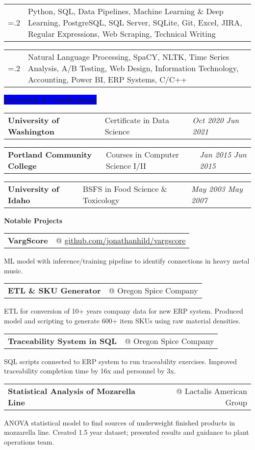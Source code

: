 \documentclass[letterpaper,12pt]{article}[leftmargin=*]
\makeatletter
\newcommand{\projects}[2]{\vspace{4pt}
  \colorbox{Copper}{\color{white}#1\hspace{9pt}\raggedbottom\normalsize\textbf{#2\hspace{4pt}}}
}
\newcommand{\education}[2]{\vspace{4pt}
  \colorbox{Blue}{\color{white}#1\hspace{9pt}\raggedbottom\normalsize\textbf{#2\hspace{4pt}}}
}
\newcommand{\resumeSectionStart}{\begin{itemize}[leftmargin=0.1in]}
\newcommand{\resumeSectionEnd}{\end{itemize}}
\newcommand{\repo}[2]{\href{#1}{\underline{#2}}}
\newcommand{\resumeProject}[3]{
  \vspace{-6pt}\item[]
    \begin{tabularx}{0.97\textwidth}{X@{\hspace{60pt}} r}
      \textbf{\color{primary}#1} & {\color{accent}\small#2} \\
    \end{tabularx}
    {#3}
}
\newcommand{\resumeSkill}[2]{
  \vspace{-6pt}
  \item[]
    \begin{tabularx}{0.97\textwidth}{>{\hsize=.2\hsize}X X }
      {\textbf{#1}} & {\small#2} \\
    \end{tabularx}
}
\newcommand{\resumeEducation}[3]{
  \vspace{-6pt}
  \item[]
    \begin{tabularx}{0.97\textwidth}[t]{>{\raggedright}X >{\raggedright\arraybackslash}X >{\raggedleft\arraybackslash}X}
      \textbf{\color{primary}#1} & {\small#2} & \textit{\color{accent}\small#3} \\
    \end{tabularx}
}
\newcommand{\tag}[1]{%
  \tikzmarknode[fill=white,fill opacity=0,draw=subtle!60!subtle,thick,rounded corners,inner sep=0.4ex,text height=1.5ex,text depth=.25ex, text opacity=1]{test}{\hspace{1pt}\small{#1}\hspace{1pt}}
}
\makeatother
\begin{document}
\resumeSectionStart{
  \resumeSkill{Proficient in}{Python, SQL, Data Pipelines, Machine Learning \& Deep Learning, PostgreSQL, SQL Server, SQLite, Git, Excel, JIRA, Regular Expressions, Web Scraping, Technical Writing}
  \resumeSkill{Familiar with}{Natural Language Processing, SpaCY, NLTK, Time Series Analysis, A/B Testing, Web Design, Information Technology, Accounting, Power BI, ERP Systems, C/C++}
}
\resumeSectionEnd{}


\education{\faGraduationCap}{Education \& Certifications}
\resumeSectionStart{
  \resumeEducation{University of Washington}{Certificate in Data Science}{Oct 2020 \textemdash{} Jun 2021}
  \resumeEducation{Portland Community College}{Courses in Computer Science I/II}{Jan 2015 \textemdash{} Jun 2015}
  \resumeEducation{University of Idaho}{BSFS in Food Science \& Toxicology}{May 2003 \textemdash{} May 2007}
}
\resumeSectionEnd{}

\projects{\faFlask}{Notable Projects}

\resumeSectionStart{
  \resumeProject{VargScore \tag{In Process}}{@ \repo{https://github.com/jonathanhild/vargscore}{github.com/jonathanhild/vargscore}}{ML model with inference/training pipeline to identify connections in heavy metal music.}
  \resumeProject{ETL \& SKU Generator}{@ Oregon Spice Company}{ETL for conversion of 10+ years company data for new ERP system. Produced model and scripting to generate 600+ item SKUs using raw material densities.}
  \resumeProject{Traceability System in SQL}{@ Oregon Spice Company}{SQL scripts connected to ERP system to run traceability exercises. Improved traceability completion time by 16x and personnel by 3x.}
  \resumeProject{Statistical Analysis of Mozarella Line}{@ Lactalis American Group}{ANOVA statistical model to find sources of underweight finished products in mozzarella line. Created 1.5 year dataset; presented results and guidance to plant operations team.}
}
\resumeSectionEnd{}

\end{document}
